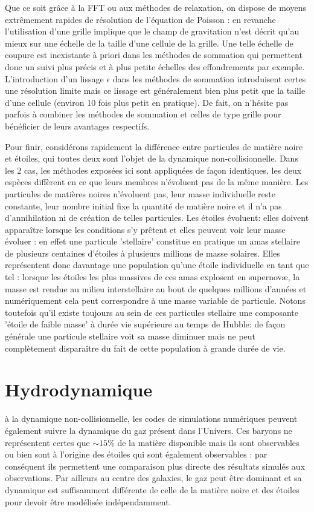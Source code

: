 Que ce soit grâce à la FFT ou aux méthodes de relaxation, on dispose de moyens extrêmement rapides de résolution de l'équation de Poisson : en revanche l'utilisation d'une grille implique que le champ de gravitation n'est décrit qu'au mieux sur une échelle de la taille d'une cellule de la grille. Une telle échelle de coupure est inexistante à priori dans les méthodes de sommation qui permettent donc un suivi plus précis et à plus petite échelles des effondrements par exemple. L'introduction d'un lissage $\epsilon$ dans les méthodes de sommation introduisent certes une résolution limite mais ce lissage est généralement bien plus petit que la taille d'une cellule (environ 10 fois plus petit en pratique). De fait, on n'hésite pas parfois à combiner les méthodes de sommation et celles de type grille pour bénéficier de leurs avantages respectifs.

Pour finir, considérons rapidement la différence entre particules de matière noire et étoiles, qui toutes deux sont l'objet de la dynamique non-collisionnelle. Dans les 2 cas, les méthodes exposées ici sont appliquées de façon identiques, les deux espèces diffèrent en ce que leurs membres n'évoluent pas de la même manière. Les particules de matières noires n'évoluent pas, leur masse individuelle reste constante, leur nombre initial fixe la quantité de matière noire et il n'a pas d'annihilation ni de création de telles particules. Les étoiles évoluent: elles doivent apparaître lorsque les conditions s'y prêtent et elles peuvent voir leur masse évoluer : en effet une particule 'stellaire' constitue en pratique un amas stellaire  de plusieurs centaines d'étoiles à plusieurs millions de masse solaires. Elles représentent donc davantage une population qu'une étoile individuelle en tant que tel : lorsque les étoiles les plus massives de ces amas explosent en supernovæ, la masse est rendue au milieu interstellaire au bout de quelques millions d'années et numériquement cela peut correspondre à une masse variable de particule. Notons toutefois qu'il existe toujours au sein de ces particules stellaire une composante 'étoile de faible masse' à durée vie supérieure au temps de Hubble: de façon générale une particule stellaire voit sa masse diminuer mais ne peut complètement disparaître du fait de cette population à grande durée de vie.

\section{Hydrodynamique}
 à la dynamique non-collisionnelle, les codes de simulations numériques peuvent également suivre la dynamique du gaz présent dans l'Univers. Ces baryons ne représentent certes que $\sim 15\%$ de la matière disponible mais ils sont observables ou bien sont à l'origine des étoiles qui sont également observables : par conséquent ils permettent une comparaison plus directe des résultats simulés aux observations. Par ailleurs au centre des galaxies, le gaz peut être dominant et sa dynamique est suffisamment différente de celle de la matière noire et des étoiles pour devoir être modélisée indépendamment.


